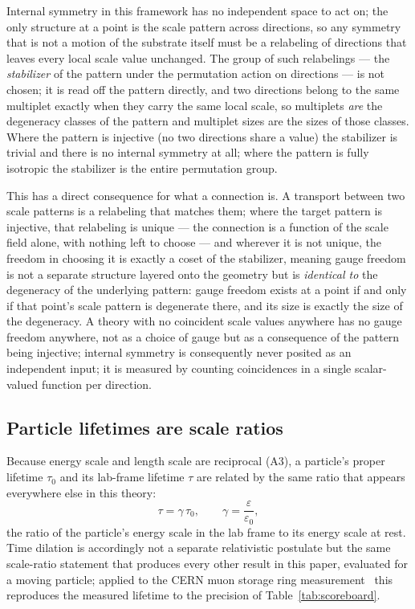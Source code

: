 \documentclass[aps,prd,twocolumn,superscriptaddress,nofootinbib]{revtex4-2}
\begin{document}
Internal symmetry in this framework has no independent space to act on;
the only structure at a point is the scale pattern across directions, so
any symmetry that is not a motion of the substrate itself must be a
relabeling of directions that leaves every local scale value unchanged.
The group of such relabelings — the \emph{stabilizer} of the pattern
under the permutation action on directions — is not chosen; it is read
off the pattern directly, and two directions belong to the same
multiplet exactly when they carry the same local scale, so multiplets
\emph{are} the degeneracy classes of the pattern and multiplet sizes are
the sizes of those classes. Where the pattern is injective (no two
directions share a value) the stabilizer is trivial and there is no
internal symmetry at all; where the pattern is fully isotropic the
stabilizer is the entire permutation group.

This has a direct consequence for what a connection is. A transport
between two scale patterns is a relabeling that matches them; where the
target pattern is injective, that relabeling is unique — the connection
is a function of the scale field alone, with nothing left to choose —
and wherever it is not unique, the freedom in choosing it is exactly a
coset of the stabilizer, meaning gauge freedom is not a separate
structure layered onto the geometry but is \emph{identical to} the
degeneracy of the underlying pattern: gauge freedom exists at a point if
and only if that point's scale pattern is degenerate there, and its size
is exactly the size of the degeneracy. A theory with no coincident scale
values anywhere has no gauge freedom anywhere, not as a choice of gauge
but as a consequence of the pattern being injective; internal symmetry is
consequently never posited as an independent input; it is measured by
counting coincidences in a single scalar-valued function per direction.

\subsection{Particle lifetimes are scale ratios}

Because energy scale and length scale are reciprocal (A3), a particle's
proper lifetime $\tau_0$ and its lab-frame lifetime $\tau$ are related by
the same ratio that appears everywhere else in this theory:
\begin{equation}
\tau = \gamma\,\tau_0, \qquad \gamma = \frac{\varepsilon}{\varepsilon_0},
\end{equation}
the ratio of the particle's energy scale in the lab frame to its energy
scale at rest. Time dilation is accordingly not a separate relativistic
postulate but the same scale-ratio statement that produces every other
result in this paper, evaluated for a moving particle; applied to the
CERN muon storage ring measurement~\cite{Bailey1977} this reproduces
the measured lifetime to the precision of
Table~\ref{tab:scoreboard}.
\end{document}
